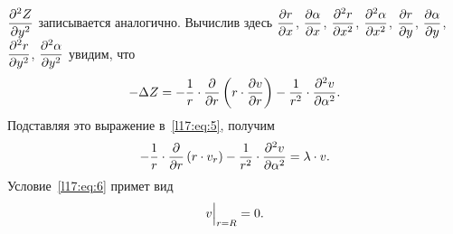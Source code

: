  $\displaystyle\frac{\partial^2Z}{\partial y^2}$ записывается аналогично. Вычислив здесь $\displaystyle\frac{\partial r}{\partial x}$, $\displaystyle\frac{\partial\alpha}{\partial x}$, $\displaystyle\frac{\partial^2r}{\partial x^2}$, $\displaystyle\frac{\partial^2\alpha}{\partial x^2}$, $\displaystyle\frac{\partial r}{\partial y}$, $\displaystyle\frac{\partial\alpha}{\partial y}$, $\displaystyle\frac{\partial^2r}{\partial y^2}$, $\displaystyle\frac{\partial^2\alpha}{\partial y^2}$ увидим, что
\begin{equation*}
	\hfill-\Delta Z=-\frac{1}{r}\cdot\pder{}{r}\left(r\cdot\pder{v}{r}\right)-\frac{1}{r^2}\cdot\pdder{v}{\alpha}.\hfill
\end{equation*}
Подставляя это выражение в~\eqref{l17:eq:5}, получим 
\begin{equation}\label{l17:eq:9}
	\hfill-\frac{1}{r}\cdot\pder{}{r}\left(r\cdot v_r\right)-\frac{1}{r^2}\cdot\pdder{v}{\alpha}=\lambda\cdot v.\hfill
\end{equation}
Условие~\eqref{l17:eq:6} примет вид
\begin{equation}\label{l17:eq:10}
	\hfill v\Big|_{r=R}=0.\hfill
\end{equation}

